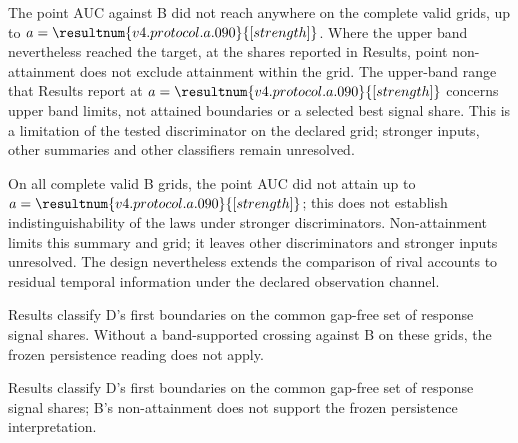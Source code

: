 The point AUC against B did not reach  anywhere on the complete valid grids, up to $a=\resultnum{v4.protocol.a.090}{[strength]}$. %
Where the upper band nevertheless reached the target, at the shares reported in Results, point non-attainment does not exclude attainment within the grid. %
The upper-band range that Results report at $a=\resultnum{v4.protocol.a.090}{[strength]}$ concerns upper band limits, not attained boundaries or a selected best signal share. %
This is a limitation of the tested discriminator on the declared grid; stronger inputs, other summaries and other classifiers remain unresolved. %

On all complete valid B grids, the point AUC did not attain  up to $a=\resultnum{v4.protocol.a.090}{[strength]}$; this does not establish indistinguishability of the laws under stronger discriminators. %
Non-attainment limits this summary and grid; it leaves other discriminators and stronger inputs unresolved. The design nevertheless extends the comparison of rival accounts to residual temporal information under the declared observation channel.

Results classify D's first boundaries on the common gap-free set of response signal shares. %
Without a band-supported crossing against B on these grids, the frozen persistence reading does not apply. %

Results classify D's first boundaries on the common gap-free set of response signal shares; B's non-attainment does not support the frozen persistence interpretation. %

